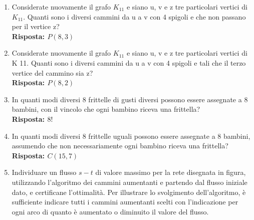 \documentclass[10pt,a4paper,titlepage]{article}
\theoremstyle{break}
\theoremstyle{break}
\theoremstyle{break}
\begin{document}
\begin{enumerate}
\item Considerate nuovamente il grafo $K_{11}$ e siano u, v e z tre particolari vertici di $K_11$. Quanti sono i diversi
cammini da u a v con 4 spigoli e che non passano per il vertice z? \\
\textbf{Risposta: $P(8,3)$} 

\item Considerate nuovamente il grafo $K_{11}$ e siano u, v e z tre particolari vertici di K 11. Quanti sono i diversi
cammini da u a v con 4 spigoli e tali che il terzo vertice del cammino sia z? \\
\textbf{Risposta: $P(8,2)$}

\item In quanti modi diversi 8 frittelle di gusti diversi possono essere assegnate a 8 bambini, con il vincolo che
ogni bambino riceva una frittella? \\
\textbf{Risposta: $8!$}

\item In quanti modi diversi 8 frittelle uguali possono essere assegnate a 8 bambini, assumendo che non necessariamente ogni bambino riceva una frittella? \\
\textbf{Risposta: $C(15, 7)$}

\item Individuare un flusso $s-t$ di valore massimo per la rete disegnata in figura, utilizzando l'algoritmo dei cammini aumentanti e partendo dal flusso iniziale dato, e certificane l'ottimalità. Per illustrare lo svolgimento
dell'algoritmo, è sufficiente indicare tutti i cammini aumentanti scelti con l'indicazione per ogni arco di
quanto è aumentato o diminuito il valore del flusso.

\end{enumerate}
\end{document}
